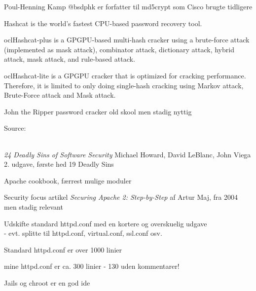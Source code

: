 \documentclass[20pt,landscape,a4paper,footrule]{foils}
\begin{document}


Poul-Henning Kamp @bsdphk er forfatter til md5crypt som Cisco brugte tidligere\\


\begin{list2}
\item Hashcat is the world's fastest CPU-based password recovery tool.
\item oclHashcat-plus is a GPGPU-based multi-hash cracker using a brute-force attack (implemented as mask attack), combinator attack, dictionary attack, hybrid attack, mask attack, and rule-based attack.
\item oclHashcat-lite is a GPGPU cracker that is optimized for cracking performance. Therefore, it is limited to only doing single-hash cracking using Markov attack, Brute-Force attack and Mask attack.
\item John the Ripper password cracker old skool men stadig nyttig
\end{list2}

Source:\\
\\





\begin{list1}
\item \emph{24 Deadly Sins of Software Security}
Michael Howard, David LeBlanc, John Viega 2. udgave, første hed 19 Deadly Sins
\end{list1}



\begin{list2}
\item Apache cookbook, færrest mulige moduler
\item Security focus artikel
\emph{Securing Apache 2: Step-by-Step}
af Artur Maj, fra 2004 men stadig relevant

\item Udskifte standard httpd.conf med en
  kortere og overskuelig udgave\\ - evt. splitte til httpd.conf,
  virtual.conf, ssl.conf osv.
\item Standard httpd.conf er over 1000 linier
\item mine httpd.conf er ca. 300 linier - 130 uden kommentarer!
\item Jails og chroot er en god ide
\end{list2}
\end{document}
